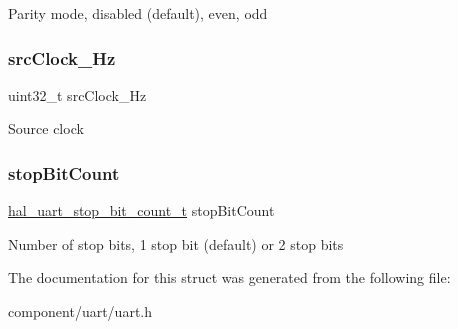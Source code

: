 Parity mode, disabled (default), even, odd \mbox{\label{struct__hal__uart__config_a91ed494cee19d1629ac4e017ce45ddbb}} 
\subsubsection{\texorpdfstring{srcClock\_Hz}{srcClock\_Hz}}
{\footnotesize\ttfamily uint32\+\_\+t src\+Clock\+\_\+\+Hz}

Source clock \mbox{\label{struct__hal__uart__config_a9cd9931237993b857304ad7dc515676f}} 
\subsubsection{\texorpdfstring{stopBitCount}{stopBitCount}}
{\footnotesize\ttfamily \mbox{\hyperlink{group___u_a_r_t___adapter_gad0fc800e49978f5aee5c162009b16bdb}{hal\+\_\+uart\+\_\+stop\+\_\+bit\+\_\+count\+\_\+t}} stop\+Bit\+Count}

Number of stop bits, 1 stop bit (default) or 2 stop bits 

The documentation for this struct was generated from the following file\+:\begin{DoxyCompactItemize}
\item 
component/uart/uart.\+h\end{DoxyCompactItemize}

